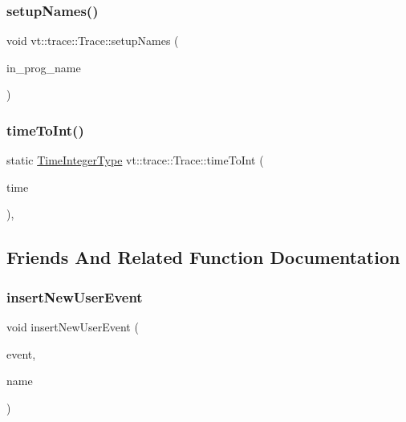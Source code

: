 \mbox{\label{structvt_1_1trace_1_1_trace_a52cc4e12a7159cf21d8893b961834af8}} 
\subsubsection{\texorpdfstring{setup\+Names()}{setupNames()}}
{\footnotesize\ttfamily void vt\+::trace\+::\+Trace\+::setup\+Names (\begin{DoxyParamCaption}\item[{std\+::string const \&}]{in\+\_\+prog\+\_\+name }\end{DoxyParamCaption})}

\mbox{\label{structvt_1_1trace_1_1_trace_a0b3d919285d2f0f33cebfb2ecbc9ad00}} 
\subsubsection{\texorpdfstring{time\+To\+Int()}{timeToInt()}}
{\footnotesize\ttfamily static \hyperlink{structvt_1_1trace_1_1_trace_ab8db9218a8ab87f59773fcbf81433787}{Time\+Integer\+Type} vt\+::trace\+::\+Trace\+::time\+To\+Int (\begin{DoxyParamCaption}\item[{double const}]{time }\end{DoxyParamCaption})\hspace{0.3cm}{\ttfamily [inline]}, {\ttfamily [static]}}



\subsection{Friends And Related Function Documentation}
\mbox{\label{structvt_1_1trace_1_1_trace_a17caa1eeb27fd6a4af8786a7f0679d77}} 
\subsubsection{\texorpdfstring{insert\+New\+User\+Event}{insertNewUserEvent}}
{\footnotesize\ttfamily void insert\+New\+User\+Event (\begin{DoxyParamCaption}\item[{\hyperlink{namespacevt_1_1trace_a5908920d051c144c89f17c69ed262350}{User\+Event\+I\+D\+Type}}]{event,  }\item[{std\+::string const \&}]{name }\end{DoxyParamCaption})\hspace{0.3cm}{\ttfamily [friend]}}

